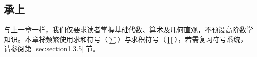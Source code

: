 \subsection{承上}

与上一章一样，我们仅要求读者掌握基础代数、算术及几何直观，不预设高阶数学知识。本章将频繁使用求和符号（$\sum$）与求积符号（$\prod$），若需复习符号系统，请参阅第 \ref{sec:section1.3.5} 节。
